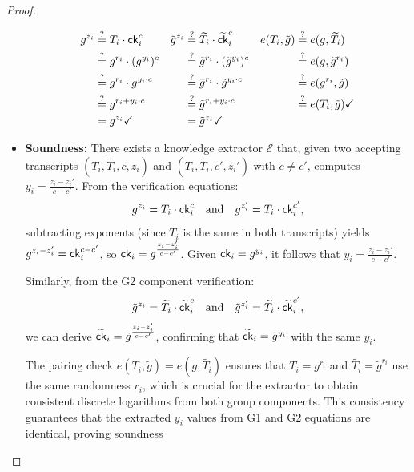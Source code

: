 \begin{proof}
\begin{itemize}
            \begin{align*}
        g^{z_i} &\stackrel{?}{=} T_i \cdot \mathsf{ck}_i^c      & \tilde{g}^{z_i} &\stackrel{?}{=} \widetilde{T_i} \cdot \widetilde{\mathsf{ck}}_i^c & e(T_i, \tilde{g}) &\stackrel{?}{=} e(g, \widetilde{T_i})     \\
        &\stackrel{?}{=} g^{r_i} \cdot (g^{y_i})^c      &  &\stackrel{?}{=} \tilde{g}^{r_i} \cdot (\tilde{g}^{y_i})^c                  & &\stackrel{?}{=} e(g, \tilde{g}^{r_i}) \\
        &\stackrel{?}{=} g^{r_i} \cdot g^{y_i \cdot c}  &   &\stackrel{?}{=} \tilde{g}^{r_i} \cdot \tilde{g}^{y_i \cdot c}             &  &\stackrel{?}{=} e(g^{r_i}, \tilde{g})  \\
        &\stackrel{?}{=} g^{r_i + y_i \cdot c}          &   &\stackrel{?}{=} \tilde{g}^{r_i + y_i \cdot c}                             & &\stackrel{?}{=} e(T_i, \tilde{g}) \checkmark \\
        &= g^{z_i} \checkmark                           &  &= \tilde{g}^{z_i} \checkmark
        \end{align*}

    \item \textbf{Soundness:} There exists a knowledge extractor $\mathcal{E}$ that, given two accepting transcripts $(T_i, \widetilde{T_i}, c, z_i)$ and $(T_i, \widetilde{T_i}, c', z_i')$ with $c \neq c'$, computes $y_i = \frac{z_i - z_i'}{c - c'}$. From the verification equations:
    \[
    g^{z_i} = T_i \cdot \mathsf{ck}_i^c \quad \text{and} \quad g^{z_i'} = T_i \cdot \mathsf{ck}_i^{c'},
    \]
    subtracting exponents (since $T_i$ is the same in both transcripts) yields $g^{z_i - z_i'} = \mathsf{ck}_i^{c - c'}$, so $\mathsf{ck}_i = g^{\frac{z_i - z_i'}{c - c'}}$. Given $\mathsf{ck}_i = g^{y_i}$, it follows that $y_i = \frac{z_i - z_i'}{c - c'}$.
    
    Similarly, from the G2 component verification:
    \[
    \tilde{g}^{z_i} = \widetilde{T_i} \cdot \widetilde{\mathsf{ck}}_i^c \quad \text{and} \quad \tilde{g}^{z_i'} = \widetilde{T_i} \cdot \widetilde{\mathsf{ck}}_i^{c'},
    \]
    we can derive $\widetilde{\mathsf{ck}}_i = \tilde{g}^{\frac{z_i - z_i'}{c - c'}}$, confirming that $\widetilde{\mathsf{ck}}_i = \tilde{g}^{y_i}$ with the same $y_i$.
    
    The pairing check $e(T_i, \tilde{g}) = e(g, \widetilde{T_i})$ ensures that $T_i = g^{r_i}$ and $\widetilde{T_i} = \tilde{g}^{r_i}$ use the same randomness $r_i$, which is crucial for the extractor to obtain consistent discrete logarithms from both group components. This consistency guarantees that the extracted $y_i$ values from G1 and G2 equations are identical, proving soundness



\end{itemize}
\end{proof}
